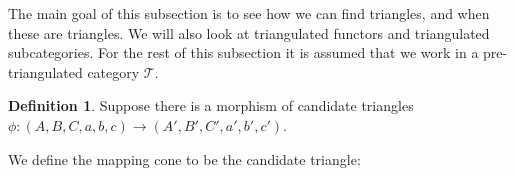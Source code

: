 \documentclass[12pt]{article}
\theoremstyle{definition}
\newtheorem{definition}{Definition}[section]
\theoremstyle{remark}
\begin{document}
            The main goal of this subsection is to see how we can find  triangles, and when these are triangles. We will also look at triangulated functors and triangulated subcategories. For the rest of this subsection it is assumed that we work in a pre-triangulated category $\mathcal{T}$.

            \begin{definition}
                Suppose there is a morphism of candidate triangles $\phi : (A,B,C,a,b,c) \rightarrow (A',B',C',a',b',c')$.
                \begin{center}
                \end{center}
                We define the mapping cone to be the candidate triangle:
                \begin{center}
                \end{center}
            \end{definition}
\end{document}
